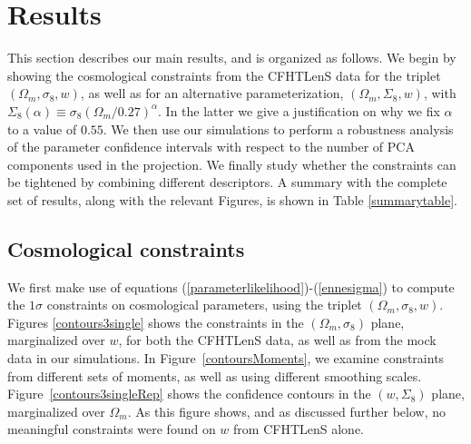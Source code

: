 \documentclass[reprint,aps,prd,superscriptaddress,showkeys,showpacs]{revtex4-1}
\begin{document}
\section{Results}
\label{results}

This section describes our main results, and is organized as follows.
We begin by showing the cosmological constraints from the CFHTLenS
data for the triplet $(\Omega_m,\sigma_8,w)$, as well as for an
alternative parameterization, $(\Omega_m,\Sigma_8,w)$, with
$\Sigma_8(\alpha)\equiv \sigma_8(\Omega_m/0.27)^\alpha$. In the latter we give a justification on why we fix $\alpha$ to a value of $0.55$. 
We then use our simulations to perform a robustness analysis of the parameter
confidence intervals with respect to the number of PCA components used
in the projection.
We finally study whether the constraints can be tightened by combining
different descriptors. A summary with the complete set of results,
along with the relevant Figures, is shown in Table \ref{summarytable}.





\subsection{Cosmological constraints}
%
We first make use of equations
(\ref{parameterlikelihood})-(\ref{ennesigma}) to compute the $1\sigma$
constraints on cosmological parameters, using the triplet
$(\Omega_m,\sigma_8,w)$.  Figures \ref{contours3single} shows the
constraints in the $(\Omega_m,\sigma_8)$ plane, marginalized over $w$,
for both the CFHTLenS data, as well as from the mock data in our
simulations.  In Figure~\ref{contoursMoments}, we examine constraints
from different sets of moments, as well as using different smoothing
scales.  Figure~\ref{contours3singleRep} shows the confidence contours
in the $(w,\Sigma_8)$ plane, marginalized over $\Omega_m$. As this
figure shows, and as discussed further below, no meaningful
constraints were found on $w$ from CFHTLenS alone.
\end{document}
